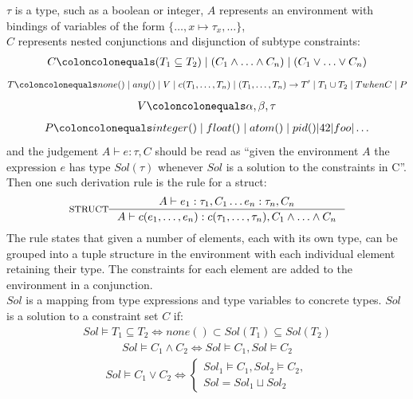 \documentclass[12pt, titlepage]{article}
\begin{document}
$\tau$ is a type, such as a boolean or integer, $A$ represents an environment with bindings of variables of the form $\{\ldots, x \mapsto \tau_x, \ldots\}$, \\
$C$ represents nested conjunctions and disjunction of subtype constraints:
\begin{align*} 
	C \coloncolonequals (T_1 \subseteq T_2) \mid (C_1 \land \ldots \land C_n) \mid (C_1 \lor \ldots \lor C_n)
\end{align*}
\begin{align*} 
	T \coloncolonequals none() \mid any() \mid V \mid c(T_1, \ldots, T_n) \mid (T_1, \ldots, T_n) \rightarrow T'\mid T_1 \cup T_2 \mid T when C \mid P
\end{align*}
\begin{align*} 
	V \coloncolonequals \alpha, \beta, \tau
\end{align*}
\begin{align*} 
	P \coloncolonequals integer() \mid float() \mid atom() \mid pid()| 42 | foo | \ldots
\end{align*}
and the judgement $A \vdash e : \tau, C$ should be read as ``given the environment $A$ the expression $e$ has type $Sol(\tau)$ whenever $Sol$ is a solution to the constraints in C''. \\
Then one such derivation rule is the rule for a struct:
                \[
\inference*[STRUCT]{  A \vdash  e_1 : \tau_1, C_1 \ldots e_n : \tau_n, C_n}
                                        {A \vdash  c(e_1, \ldots, e_n) : c(\tau_1, \ldots, \tau_n), C_1 \land \ldots \land C_n}
                \]
The rule states that given a number of elements, each with its own type, can be grouped into a tuple structure in the environment with each individual element retaining their type. The constraints for each element are added to the environment in a conjunction. \\
$Sol$ is a mapping from type expressions and type variables to concrete types. $Sol$ is a solution to a constraint set $C$ if:
\begin{align*} 
	Sol \models T_1 \subseteq T_2 \iff none() \subset Sol(T_1) \subseteq Sol(T_2)
\end{align*}
\begin{align*} 
	Sol \models C_1 \land C_2 \iff Sol \models C_1, Sol \models  C_2
\end{align*}
\begin{align*} 
	Sol \models C_1 \lor C_2 \iff \begin{cases} Sol_1 \models C_1, Sol_2 \models C_2, \\
	                                            Sol = Sol_1 \sqcup Sol_2 \end{cases}
\end{align*}
\end{document}
